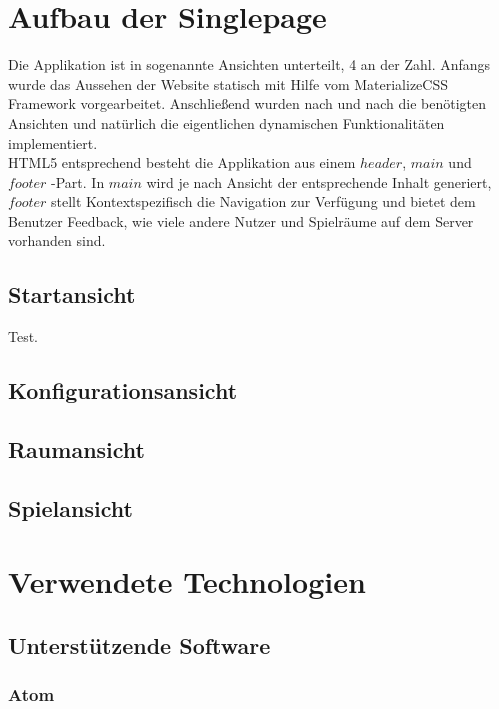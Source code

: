 \documentclass[12pt]{scrartcl}
\begin{document}
\section{Aufbau der Singlepage}

	Die Applikation ist in sogenannte Ansichten unterteilt, 4 an der Zahl. Anfangs wurde das Aussehen der Website statisch mit Hilfe vom MaterializeCSS Framework vorgearbeitet. Anschließend wurden nach und nach die benötigten Ansichten und natürlich die eigentlichen dynamischen Funktionalitäten implementiert.\\
	
	HTML5 entsprechend besteht die Applikation aus einem $header$, $main$ und $footer$ -Part. In $main$ wird je nach Ansicht der entsprechende Inhalt generiert, $footer$ stellt Kontextspezifisch die Navigation zur Verfügung und bietet dem Benutzer Feedback, wie viele andere Nutzer und Spielräume auf dem Server vorhanden sind.

	\subsection{Startansicht}
	
		Test.
	
	\subsection{Konfigurationsansicht}
	
	\subsection{Raumansicht}
	
	\subsection{Spielansicht}

\section{Verwendete Technologien}

	\subsection{Unterstützende Software}
	
		\subsubsection{Atom}
		
\end{document}
